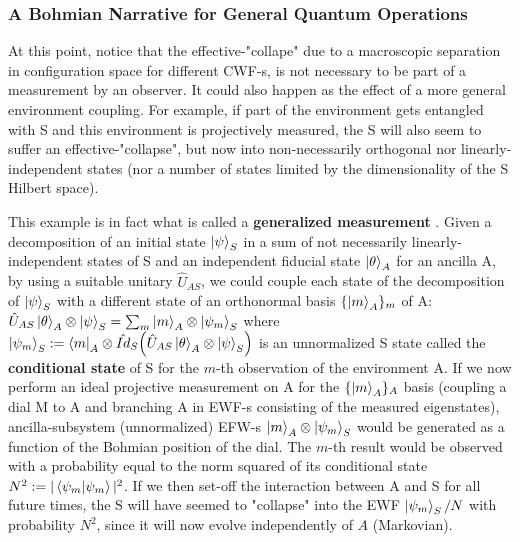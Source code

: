 \documentclass[11pt, a4paper]{article} %
\begin{document}
\subsubsection*{A Bohmian Narrative for General Quantum Operations}
At this point, notice that the effective-"collape" due to a macroscopic separation in configuration space for different CWF-s, is not necessary to be part of a measurement by an observer. It could also happen as the effect of a more general environment coupling. 
For example, if part of the environment gets entangled with S and this environment is projectively measured, the S will also seem to suffer an effective-"collapse", but now into non-necessarily orthogonal nor linearly-independent states (nor a number of states limited by the dimensionality of the S Hilbert space). 

This example is in fact what is called a {\bf generalized measurement} \cite{Generalized, Durr}. Given a decomposition of an initial state $\ket{\psi}_S$ in a sum of not necessarily linearly-independent states of S and an independent fiducial state $\ket{\theta}_A$ for an ancilla A, by using a suitable unitary $\hat{U}_{AS}$, we could couple each state of the decomposition of $\ket{\psi}_S$ with a different state of an orthonormal basis $\{\ket{m}_A\}_m$ of A: $\hat{U}_{AS}\ket{\theta}_A\otimes\ket{\psi}_S=\sum_m \ket{m}_A\otimes \ket{\psi_m}_S$ where $\ket{\psi_m}_S:=\bra{m}_A\otimes\hat{Id}_S \qty(\hat{U}_{AS}\ket{\theta}_A\otimes\ket{\psi}_S)$ is an unnormalized S state called the {\bf conditional state} of S for the $m$-th observation of the environment A. If we now perform an ideal projective measurement on A for the $\{\ket{m}_A\}_A$ basis (coupling a dial M to A and branching A in EWF-s consisting of the measured eigenstates), ancilla-subsystem (unnormalized) EFW-s $\ket{m}_A\otimes \ket{\psi_m}_S$ would be generated as a function of the Bohmian position of the dial. The $m$-th result would be observed with a probability equal to the norm squared of its conditional state $N^2:=|\bra{\psi_m}\ket{\psi_m}|^2$. If we then set-off the interaction between A and S for all future times, the S will have seemed to "collapse" into the EWF $\ket{\psi_m}_S/N$ with probability $N^2$, since it will now evolve independently of $A$ (Markovian).
\end{document}
